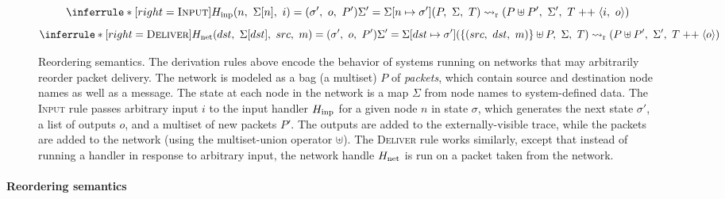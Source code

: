 \begin{figure}[t]
  \centering

  \begin{footnotesize} \begin{spacing}{1.5} \[
    \inferrule*[right=\textsc{Input}]{
      \fHinp(n,\ \Sigma[n],\ i) = (\sigma',\ o,\ P') \\
      \Sigma' = \Sigma[n \mapsto \sigma']
    }{
      (P,\ \Sigma,\ T) \fastep (P \uplus P',\ \Sigma',\ T \appop \traceelt{i,\ o})
    }
  \]\[
    \inferrule*[right=\textsc{Deliver}]{
      \fHnet(dst,\ \Sigma[dst],\ src,\ m) = (\sigma',\ o,\ P') \\
      \Sigma' = \Sigma[dst \mapsto \sigma']
    }{
      (\{(src,\ dst,\ m)\} \uplus P,\ \Sigma,\ T) \fastep (P \uplus P',\ \Sigma',\ T \appop \traceelt{o})
    }
  \] \end{spacing} \end{footnotesize}

  \caption{Reordering semantics.
  The derivation rules above encode the behavior of systems running on
  networks that may arbitrarily reorder packet delivery.
  The network is modeled as a bag (\ie a multiset) $P$ of \textit{packets}, which
  contain source and destination node names as well as a message.
  The state at each node in the network is a map
  $\Sigma$ from node names to system-defined data.
  The \textsc{Input} rule passes arbitrary input $i$
  to the input handler $H_{\mathrm{inp}}$ for a given node $n$ in state
  $\sigma$, which generates the next state $\sigma'$, a list of
  outputs $o$, and a multiset of new packets $P'$. The outputs are
  added to the externally-visible trace, while the packets are added
  to the network (using the multiset-union operator $\uplus$).
  The \textsc{Deliver} rule works similarly, except that instead of
  running a handler in response to arbitrary input, the network handle
  $H_{\mathrm{net}}$ is run on a packet taken from the network.
}
\label{fig:async-semantics}
\end{figure}

\paragraph{Reordering semantics}

